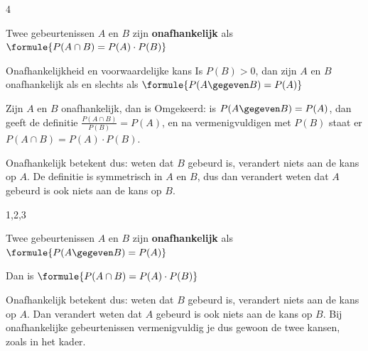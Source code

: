 \begin{alleenvoor}{4}
\begin{theorie}
Twee gebeurtenissen $A$ en $B$ zijn \textbf{\textcolor{accent}{onafhankelijk}} als \quad $\formule{P(A \cap B) = P(A) \cdot P(B)}$

\begin{stelling}{Onafhankelijkheid en voorwaardelijke kans}
Is $P(B) > 0$, dan zijn $A$ en $B$ onafhankelijk als en slechts als \quad $\formule{P(A \gegeven B) = P(A)}$
\end{stelling}

\begin{bewijs}
Zijn $A$ en $B$ onafhankelijk, dan is
Omgekeerd: is $P(A \gegeven B) = P(A)$, dan geeft de definitie $\frac{P(A \cap B)}{P(B)} = P(A)$, en na vermenigvuldigen met $P(B)$ staat er $P(A \cap B) = P(A) \cdot P(B)$.
\end{bewijs}
\end{theorie}

Onafhankelijk betekent dus: weten dat $B$ gebeurd is, verandert niets aan de kans op $A$. De definitie is symmetrisch in $A$ en $B$, dus dan verandert weten dat $A$ gebeurd is ook niets aan de kans op $B$.
\end{alleenvoor}
\begin{alleenvoor}{1,2,3}
\begin{theorie}
Twee gebeurtenissen $A$ en $B$ zijn \textbf{\textcolor{accent}{onafhankelijk}} als \quad $\formule{P(A \gegeven B) = P(A)}$

\vspace{1mm}
Dan is \quad $\formule{P(A \cap B) = P(A) \cdot P(B)}$
\end{theorie}

Onafhankelijk betekent dus: weten dat $B$ gebeurd is, verandert niets aan de kans op $A$. Dan verandert weten dat $A$ gebeurd is ook niets aan de kans op $B$. Bij onafhankelijke gebeurtenissen vermenigvuldig je dus gewoon de twee kansen, zoals in het kader.
\end{alleenvoor}

